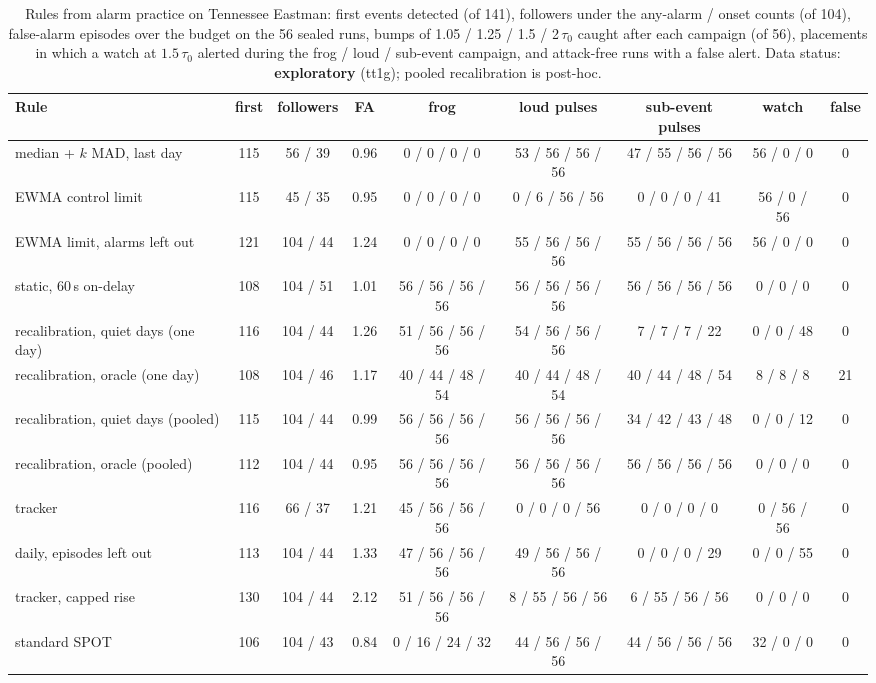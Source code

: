 \documentclass[sigconf]{acmart}
\begin{document}
\begin{table}[t]
\caption{Rules from alarm practice on Tennessee Eastman: first events detected (of 141), followers
under the any-alarm / onset counts (of 104), false-alarm episodes over the budget on the 56 sealed runs,
bumps of 1.05 / 1.25 / 1.5 / 2\,$\tau_0$ caught after each campaign (of 56), placements in which a watch at
$1.5\,\tau_0$ alerted during the frog / loud / sub-event campaign, and attack-free runs with a false
alert. Data status: \textbf{exploratory} (tt1g); pooled recalibration is post-hoc.}
\label{tab:practice}
\small
\begin{tabularx}{\textwidth}{@{}Lcccccccc@{}}
\toprule
Rule & first & followers & FA & frog & loud pulses & sub-event pulses & watch & false \\
\midrule
median + $k$ MAD, last day & 115 & 56 / 39 & 0.96 & 0 / 0 / 0 / 0 & 53 / 56 / 56 / 56 & 47 / 55 / 56 / 56 & 56 / 0 / 0 & 0 \\
EWMA control limit & 115 & 45 / 35 & 0.95 & 0 / 0 / 0 / 0 & 0 / 6 / 56 / 56 & 0 / 0 / 0 / 41 & 56 / 0 / 56 & 0 \\
EWMA limit, alarms left out & 121 & 104 / 44 & 1.24 & 0 / 0 / 0 / 0 & 55 / 56 / 56 / 56 & 55 / 56 / 56 / 56 & 56 / 0 / 0 & 0 \\
static, 60\,s on-delay & 108 & 104 / 51 & 1.01 & 56 / 56 / 56 / 56 & 56 / 56 / 56 / 56 & 56 / 56 / 56 / 56 & 0 / 0 / 0 & 0 \\
recalibration, quiet days (one day) & 116 & 104 / 44 & 1.26 & 51 / 56 / 56 / 56 & 54 / 56 / 56 / 56 & 7 / 7 / 7 / 22 & 0 / 0 / 48 & 0 \\
recalibration, oracle (one day) & 108 & 104 / 46 & 1.17 & 40 / 44 / 48 / 54 & 40 / 44 / 48 / 54 & 40 / 44 / 48 / 54 & 8 / 8 / 8 & 21 \\
recalibration, quiet days (pooled) & 115 & 104 / 44 & 0.99 & 56 / 56 / 56 / 56 & 56 / 56 / 56 / 56 & 34 / 42 / 43 / 48 & 0 / 0 / 12 & 0 \\
recalibration, oracle (pooled) & 112 & 104 / 44 & 0.95 & 56 / 56 / 56 / 56 & 56 / 56 / 56 / 56 & 56 / 56 / 56 / 56 & 0 / 0 / 0 & 0 \\
tracker & 116 & 66 / 37 & 1.21 & 45 / 56 / 56 / 56 & 0 / 0 / 0 / 56 & 0 / 0 / 0 / 0 & 0 / 56 / 56 & 0 \\
daily, episodes left out & 113 & 104 / 44 & 1.33 & 47 / 56 / 56 / 56 & 49 / 56 / 56 / 56 & 0 / 0 / 0 / 29 & 0 / 0 / 55 & 0 \\
tracker, capped rise & 130 & 104 / 44 & 2.12 & 51 / 56 / 56 / 56 & 8 / 55 / 56 / 56 & 6 / 55 / 56 / 56 & 0 / 0 / 0 & 0 \\
standard SPOT & 106 & 104 / 43 & 0.84 & 0 / 16 / 24 / 32 & 44 / 56 / 56 / 56 & 44 / 56 / 56 / 56 & 32 / 0 / 0 & 0 \\
\bottomrule
\end{tabularx}
\end{table}
\end{document}
